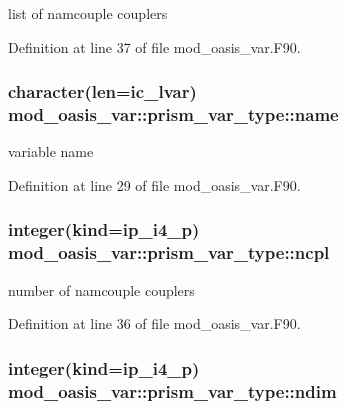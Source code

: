 list of namcouple couplers 



Definition at line 37 of file mod\+\_\+oasis\+\_\+var.\+F90.

\hypertarget{structmod__oasis__var_1_1prism__var__type_a90fb2c4252337f674bd4e3dc29c02f6b}{
\subsubsection[{name}]{\setlength{\rightskip}{0pt plus 5cm}character(len=ic\+\_\+lvar) mod\+\_\+oasis\+\_\+var\+::prism\+\_\+var\+\_\+type\+::name\hspace{0.3cm}{\ttfamily [private]}}}\label{structmod__oasis__var_1_1prism__var__type_a90fb2c4252337f674bd4e3dc29c02f6b}


variable name 



Definition at line 29 of file mod\+\_\+oasis\+\_\+var.\+F90.

\hypertarget{structmod__oasis__var_1_1prism__var__type_a5e74e0f54df6c10c13569250bd616c94}{
\subsubsection[{ncpl}]{\setlength{\rightskip}{0pt plus 5cm}integer(kind=ip\+\_\+i4\+\_\+p) mod\+\_\+oasis\+\_\+var\+::prism\+\_\+var\+\_\+type\+::ncpl\hspace{0.3cm}{\ttfamily [private]}}}\label{structmod__oasis__var_1_1prism__var__type_a5e74e0f54df6c10c13569250bd616c94}


number of namcouple couplers 



Definition at line 36 of file mod\+\_\+oasis\+\_\+var.\+F90.

\hypertarget{structmod__oasis__var_1_1prism__var__type_a21345a842b0dfd5dcf4a00c2356035da}{
\subsubsection[{ndim}]{\setlength{\rightskip}{0pt plus 5cm}integer(kind=ip\+\_\+i4\+\_\+p) mod\+\_\+oasis\+\_\+var\+::prism\+\_\+var\+\_\+type\+::ndim\hspace{0.3cm}{\ttfamily [private]}}}\label{structmod__oasis__var_1_1prism__var__type_a21345a842b0dfd5dcf4a00c2356035da}


